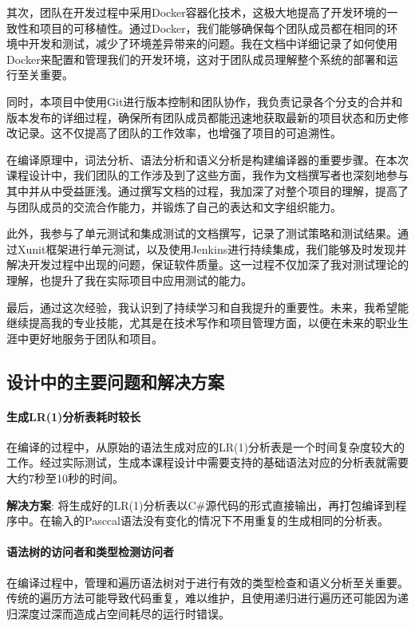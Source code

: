 \documentclass[../main.tex]{subfiles}
\begin{document}
其次，团队在开发过程中采用Docker容器化技术，这极大地提高了开发环境的一致性和项目的可移植性。通过Docker，我们能够确保每个团队成员都在相同的环境中开发和测试，减少了环境差异带来的问题。我在文档中详细记录了如何使用Docker来配置和管理我们的开发环境，这对于团队成员理解整个系统的部署和运行至关重要。

同时，本项目中使用Git进行版本控制和团队协作，我负责记录各个分支的合并和版本发布的详细过程，确保所有团队成员都能迅速地获取最新的项目状态和历史修改记录。这不仅提高了团队的工作效率，也增强了项目的可追溯性。

在编译原理中，词法分析、语法分析和语义分析是构建编译器的重要步骤。在本次课程设计中，我们团队的工作涉及到了这些方面，我作为文档撰写者也深刻地参与其中并从中受益匪浅。通过撰写文档的过程，我加深了对整个项目的理解，提高了与团队成员的交流合作能力，并锻炼了自己的表达和文字组织能力。

此外，我参与了单元测试和集成测试的文档撰写，记录了测试策略和测试结果。通过Xunit框架进行单元测试，以及使用Jenkins进行持续集成，我们能够及时发现并解决开发过程中出现的问题，保证软件质量。这一过程不仅加深了我对测试理论的理解，也提升了我在实际项目中应用测试的能力。

最后，通过这次经验，我认识到了持续学习和自我提升的重要性。未来，我希望能继续提高我的专业技能，尤其是在技术写作和项目管理方面，以便在未来的职业生涯中更好地服务于团队和项目。

\subsection{设计中的主要问题和解决方案}

\paragraph{生成LR(1)分析表耗时较长}
 在编译的过程中，从原始的语法生成对应的LR(1)分析表是一个时间复杂度较大的工作。经过实际测试，生成本课程设计中需要支持的基础语法对应的分析表就需要大约7秒至10秒的时间。

\textbf{解决方案}: 将生成好的LR(1)分析表以C\#源代码的形式直接输出，再打包编译到程序中。在输入的Pasccal语法没有变化的情况下不用重复的生成相同的分析表。

\paragraph{语法树的访问者和类型检测访问者}
在编译过程中，管理和遍历语法树对于进行有效的类型检查和语义分析至关重要。传统的遍历方法可能导致代码重复，难以维护，且使用递归进行遍历还可能因为递归深度过深而造成占空间耗尽的运行时错误。
\end{document}

